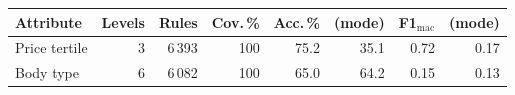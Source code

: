 \begin{tabular}{@{}lrrrrrrr@{}}
\toprule
Attribute & Levels & Rules & Cov.\,\% & Acc.\,\% & (mode) & F1$_\mathrm{mac}$ & (mode) \\
\midrule
Price tertile & 3 & 6\,393 & 100 & 75.2 & 35.1 & 0.72 & 0.17 \\
Body type & 6 & 6\,082 & 100 & 65.0 & 64.2 & 0.15 & 0.13 \\
\bottomrule
\end{tabular}
